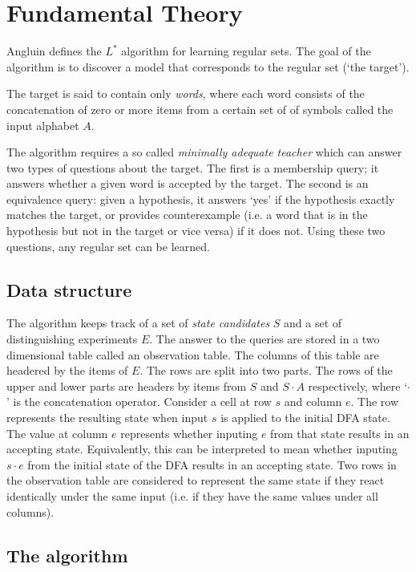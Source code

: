 \documentclass[multi,crop=false,class=article]{standalone}
\newcommand{\concat}{\cdot}
\begin{document}
\section{Fundamental Theory}
\label{sec:fundamental-theory}

Angluin defines the $L^*$ algorithm for learning regular sets\cite{Angluin87}.
The goal of the algorithm is to discover a model that corresponds to the regular
set (`the target').

The target is said to contain only \textit{words}, where each word consists
of the concatenation of zero or more items from a certain set of of symbols
called the input alphabet $A$.

The algorithm requires a so called \textit{minimally adequate teacher} which can
answer two types of questions about the target. The first is a membership query;
it answers whether a given word is accepted by the target. The second is an
equivalence query: given a hypothesis, it answers `yes' if the hypothesis
exactly matches the target, or provides counterexample (i.e. a word that is in
the hypothesis but not in the target or vice versa) if it does not. Using these
two questions, any regular set can be learned.

\subsection {Data structure}

The algorithm keeps track of a set of \textit{state candidates} $S$ and a set of
distinguishing experiments  $E$. The answer to the queries are stored in a two
dimensional table called an observation table. The columns of this table are
headered by the items of $E$. The rows are split into two parts. The rows of the
upper and lower parts are headers by items from $S$ and $S \concat A$
respectively, where `$\concat$' is the concatenation operator. Consider a cell
at row $s$ and column $e$. The row represents the resulting state when input $s$
is applied to the initial DFA state. The value at column $e$ represents whether
inputing $e$ from that state results in an accepting state. Equivalently, this
can be interpreted to mean whether inputing $s \concat e$ from the initial state
of the DFA results in an accepting state. Two rows in the observation table are
considered to represent the same state if they react identically under the same
input (i.e. if they have the same values under all columns).

\subsection {The algorithm}
\end{document}
